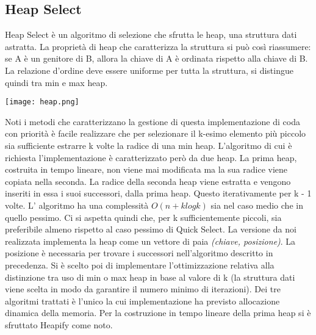 \documentclass{article}
\begin{document}
\subsection{Heap Select}
Heap Select è un algoritmo di selezione che sfrutta le heap, una struttura dati astratta.
\newline
\newline
La proprietà di heap che caratterizza la struttura si può così riassumere:
\newline
se A è un genitore di B, allora la chiave di A è ordinata rispetto alla chiave di B.
\newline
La relazione d'ordine deve essere uniforme per tutta la struttura, si distingue quindi tra min e max heap.
\begin{center}
\texttt{[image: heap.png]}
\end{center}
Noti i metodi che caratterizzano la gestione di questa implementazione di coda con priorità è facile realizzare che per selezionare il k-esimo elemento più piccolo sia sufficiente estrarre k volte la radice di una min heap.
\newline
\newline
L'algoritmo di cui è richiesta l'implementazione è caratterizzato però da due heap.
\newline
La prima heap, costruita in tempo lineare, non viene mai modificata ma la sua radice viene copiata nella seconda.
\newline
\newline
La radice della seconda heap viene estratta e vengono inseriti in essa i suoi successori, dalla prima heap.
\newline
Questo iterativamente per k - 1 volte.
\newline
\newline
L' algoritmo ha una complessità $O(n + k log k)$ sia nel caso medio che in quello pessimo.
\newline
Ci si aspetta quindi che, per k sufficientemente piccoli, sia preferibile almeno rispetto al caso pessimo di Quick Select.
\newline
\newline
La versione da noi realizzata implementa la heap come un vettore di paia \textit{(chiave, posizione)}.
\newline
La posizione è necessaria per trovare i successori nell'algoritmo descritto in precedenza.
\newline
Si è scelto poi di implementare l'ottimizzazione relativa alla distinzione tra uso di min o max heap in base al valore di k (la struttura dati viene scelta in modo da garantire il numero minimo di iterazioni).
\newline
Dei tre algoritmi trattati è l'unico la cui implementazione ha previsto allocazione dinamica della memoria.
\newline
Per la costruzione in tempo lineare della prima heap si è sfruttato Heapify come noto.
\end{document}
